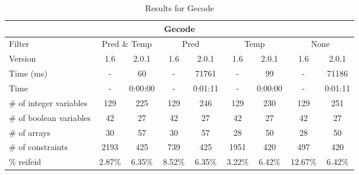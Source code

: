 \documentclass{standalone}
\begin{document}
\begin{table}[H]
\footnotesize
\centering
\begin{tabular}{lc|c|c|c|c|c|c|c}
\multicolumn{9}{c}{Gecode} \\ 
\hline\hline Filter & \multicolumn{2}{c|}{Pred \& Temp} &\multicolumn{2}{c|}{Pred}  & \multicolumn{2}{c|}{Temp} & \multicolumn{2}{c}{None} \\ 
\hline Version & 1.6 & 2.0.1 & 1.6 & 2.0.1 & 1.6 & 2.0.1 & 1.6 & 2.0.1 \\ 
Time (ms)               & - & 60 & - & 71761 & - & 99 & - & 71186 \\ 
Time                    & - & 0:00:00 & - & 0:01:11 & - & 0:00:00 & - & 0:01:11 \\ 
\# of integer variables & 129 & 225 & 129 & 246 & 129 & 230 & 129 & 251 \\ 
\# of boolean variables & 42 & 27 & 42 & 27 & 42 & 27 & 42 & 27 \\ 
\# of arrays            & 30 & 57 & 30 & 57 & 28 & 50 & 28 & 50 \\ 
\# of constraints       & 2193 & 425 & 739 & 425 & 1951 & 420 & 497 & 420 \\ 
\% reifeid               & 2.87\% & 6.35\% & 8.52\% & 6.35\% & 3.22\% & 6.42\% & 12.67\% & 6.42\% \\ 
\end{tabular}
\caption{Results for Gecode}\label{tab:res_gecode}
\end{table}
\end{document}
